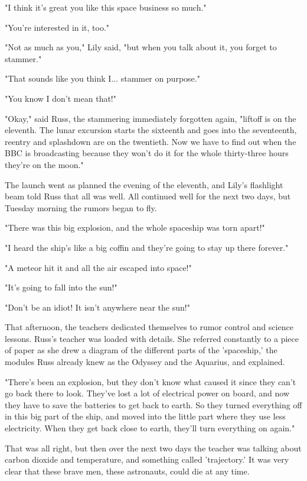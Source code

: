 \documentclass[a4paper,11pt]{article}
\begin{document}
"I think it's great you like this space business so much."

"You're interested in it, too."

"Not as much as you," Lily said, "but when you talk about it, you forget to stammer."

"That sounds like you think I... stammer on purpose."

"You know I don't mean that!"

"Okay," said Russ, the stammering immediately forgotten again, "liftoff is on the eleventh. The lunar excursion starts the sixteenth and goes into the seventeenth, reentry and splashdown are on the twentieth. Now we have to find out when the BBC is broadcasting because they won't do it for the whole thirty-three hours they're on the moon."

The launch went as planned the evening of the eleventh, and Lily's flashlight beam told Russ that all was well. All continued well for the next two days, but Tuesday morning the rumors began to fly.

"There was this big explosion, and the whole spaceship was torn apart!"

"I heard the ship's like a big coffin and they're going to stay up there forever."

"A meteor hit it and all the air escaped into space!"

"It's going to fall into the sun!"

"Don't be an idiot! It isn't anywhere near the sun!"

That afternoon, the teachers dedicated themselves to rumor control and science lessons. Russ's teacher was loaded with details. She referred constantly to a piece of paper as she drew a diagram of the different parts of the 'spaceship,' the modules Russ already knew as the Odyssey and the Aquarius, and explained.

"There's been an explosion, but they don't know what caused it since they can't go back there to look. They've lost a lot of electrical power on board, and now they have to save the batteries to get back to earth. So they turned everything off in this big part of the ship, and moved into the little part where they use less electricity. When they get back close to earth, they'll turn everything on again."

That was all right, but then over the next two days the teacher was talking about carbon dioxide and temperature, and something called 'trajectory.' It was very clear that these brave men, these astronauts, could die at any time.
\end{document}
